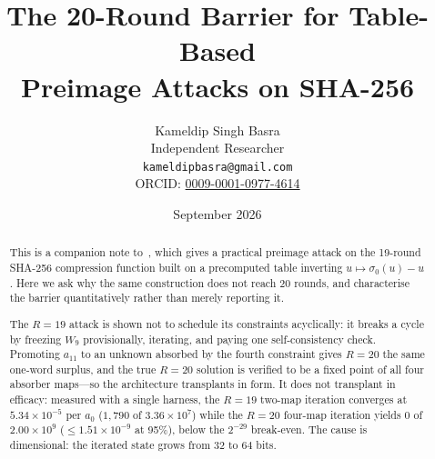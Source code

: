 \documentclass[11pt,a4paper]{article}
\begin{document}
\title{\textbf{The 20-Round Barrier for Table-Based\\
Preimage Attacks on SHA-256}}

\author{Kameldip Singh Basra \\[4pt]
        \small Independent Researcher \\
        \small \texttt{kameldipbasra@gmail.com} \\
        \small ORCID: \href{https://orcid.org/0009-0001-0977-4614}{0009-0001-0977-4614}}
\date{September 2026}

\maketitle

\begin{abstract}
This is a companion note to~\cite{Basra2026R19}, which gives a practical
preimage attack on the 19-round SHA-256 compression function built on a
precomputed table inverting $u\mapsto\sigma_0(u)-u$.  Here we ask why the same construction
does not reach 20 rounds, and characterise the barrier quantitatively rather
than merely reporting it.

The $R{=}19$ attack is shown not to schedule its constraints acyclically: it
breaks a cycle by freezing $W_9$ provisionally, iterating, and paying one
self-consistency check.  Promoting $a_{11}$ to an unknown absorbed by the
fourth constraint gives $R{=}20$ the same one-word surplus, and the true
$R{=}20$ solution is verified to be a fixed point of all four absorber maps---so
the architecture transplants in form.  It does not transplant in efficacy:
measured with a single harness, the $R{=}19$ two-map iteration converges at
$5.34\times10^{-5}$ per $a_0$ ($1{,}790$ of $3.36\times10^{7}$) while the
$R{=}20$ four-map iteration yields $0$ of $2.00\times10^{9}$
($\le1.51\times10^{-9}$ at 95\%), below the $2^{-29}$ break-even.  The cause is
dimensional: the iterated state grows from $32$ to $64$ bits.


\end{abstract}
\end{document}

